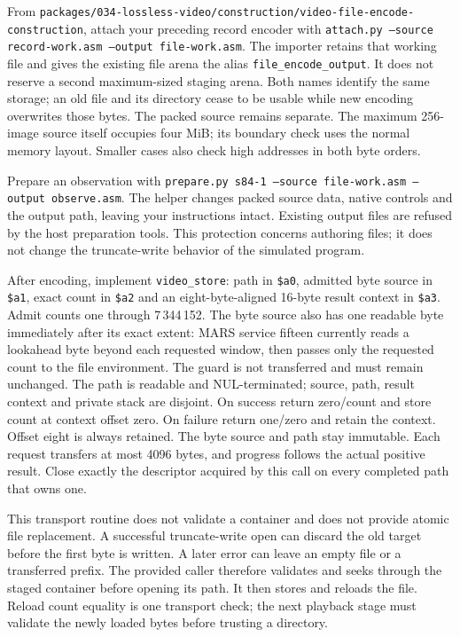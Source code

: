From \texttt{packages/034-lossless-video/construction/video-file-encode-construction}, attach your preceding record
encoder with \texttt{attach.py --source record-work.asm --output file-work.asm}.
The importer retains that working file and gives the existing file arena the alias
\texttt{file\_encode\_output}. It does not reserve a second maximum-sized staging
arena. Both names identify the same storage; an old file and its directory cease
to be usable while new encoding overwrites those bytes. The packed source remains
separate. The maximum 256-image source itself occupies four MiB; its boundary check
uses the normal memory layout. Smaller cases also check high addresses in both
byte orders.

Prepare an observation with \texttt{prepare.py s84-1 --source file-work.asm --output
  observe.asm}. The helper changes packed source data, native controls and the output
path, leaving your instructions intact. Existing output files are refused by the
host preparation tools. This protection concerns authoring files; it does not
change the truncate-write behavior of the simulated program.

After encoding, implement \texttt{video\_store}: path in \texttt{\$a0}, admitted
byte source in \texttt{\$a1}, exact count in \texttt{\$a2} and an eight-byte-aligned
16-byte result context in \texttt{\$a3}. Admit counts one through 7\,344\,152.
The byte source also has one readable byte immediately after its exact extent:
MARS service fifteen currently reads a lookahead byte beyond each requested
window, then passes only the requested count to the file environment. The guard
is not transferred and must remain unchanged. The path is readable and
NUL-terminated; source, path, result context and private
stack are disjoint. On success return zero/count and store count at context offset
zero. On failure return one/zero and retain the context. Offset eight is always
retained. The byte source and path stay immutable. Each request transfers at most
4096 bytes, and progress follows the actual positive result. Close exactly the
descriptor acquired by this call on every completed path that owns one.

This transport routine does not validate a container and does not provide atomic
file replacement. A successful truncate-write open can discard the old target
before the first byte is written. A later error can leave an empty file or a
transferred prefix. The provided caller therefore validates and seeks through the
staged container before opening its path. It then stores and reloads the file.
Reload count equality is one transport check; the next playback stage must validate
the newly loaded bytes before trusting a directory.
